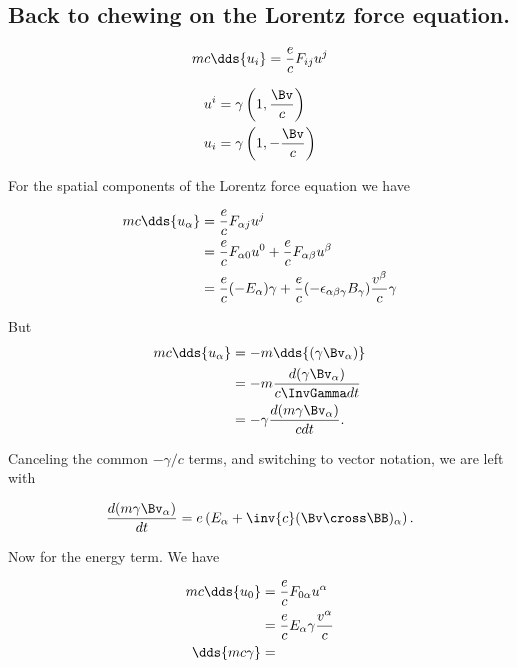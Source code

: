 \subsection{Back to chewing on the Lorentz force equation.}

\begin{equation}\label{eqn:relativisticElectrodynamicsL11:270}
m c \dds{ u_i } = \frac{e}{c} F_{ij} u^j
\end{equation}

\begin{align}\label{eqn:relativisticElectrodynamicsL11:290}
u^i &= \gamma \left( 1, \frac{\Bv}{c} \right) \\
u_i &= \gamma \left( 1, -\frac{\Bv}{c} \right)
\end{align}

For the spatial components of the Lorentz force equation we have

\begin{align*}
m c \dds{ u_\alpha } 
&= \frac{e}{c} F_{\alpha j} u^j \\
&= \frac{e}{c} F_{\alpha 0} u^0
+ \frac{e}{c} F_{\alpha \beta} u^\beta \\
&= \frac{e}{c} (-E_{\alpha}) \gamma
+ \frac{e}{c} (- \epsilon_{\alpha\beta\gamma} B_\gamma ) \frac{v^\beta}{c} \gamma 
\end{align*}

But
\begin{align*}
m c \dds{ u_\alpha } 
&= -m \dds{(\gamma \Bv_\alpha)} \\
&= -m \frac{d(\gamma \Bv_\alpha)}{c \InvGamma dt} \\
&= -\gamma \frac{d(m \gamma \Bv_\alpha)}{c dt}.
\end{align*}

Canceling the common $-\gamma/c$ terms, and switching to vector notation, we are left with

\begin{equation}\label{eqn:relativisticElectrodynamicsL11:310}
\frac{d( m \gamma \Bv_\alpha)}{dt} = e \left( E_\alpha + \inv{c} (\Bv \cross \BB)_\alpha \right).
\end{equation}

Now for the energy term.  We have 

\begin{align*}
m c \dds{u_0} 
&= \frac{e}{c} F_{0\alpha} u^\alpha \\
&= \frac{e}{c} E_{\alpha} \gamma \frac{v^\alpha}{c} \\
\dds{ m c \gamma } &=
\end{align*}

